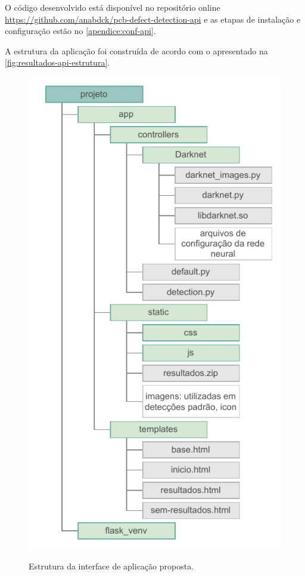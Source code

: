 O código desenvolvido está disponível no repositório online \url{https://github.com/anabdck/pcb-defect-detection-api} e as etapas de instalação e configuração estão no \autoref{apendice:conf-api}.

A estrutura da aplicação foi construída de acordo com o apresentado na \autoref{fig:resultados-api-estrutura}.

\begin{figure}[!h] %
  \centering
  \caption{Estrutura da interface de aplicação proposta.}
  \includegraphics[scale=1.05]{img/img-resultados-api-estrutura.pdf}
  \label{fig:resultados-api-estrutura}
\end{figure}

